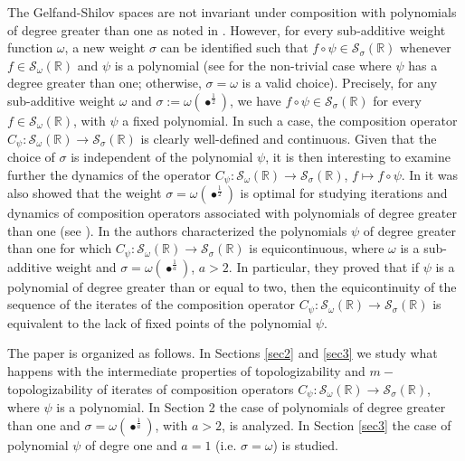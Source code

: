 \documentclass[12pt,reqno]{amsart} %
\numberwithin{equation}{section}
\begin{document}
The Gelfand-Shilov spaces are not invariant under composition with polynomials of degree greater than one as noted in \cite[Theorem 3.9]{jmaa}. However, for every sub-additive weight function $\omega$, a new weight $\sigma$
can be identified such that $f\circ \psi\in {\mathcal S}_\sigma({\mathbb R})$ 
whenever $f\in {\mathcal S}_\omega({\mathbb R})$ and $\psi$
is a polynomial (see \cite[Theorem 4.4]{jmaa} for the non-trivial case where $\psi$ has a degree greater than one; otherwise, $\sigma=\omega$ is a valid choice). Precisely, for any  sub-additive weight $\omega$  and $\sigma:=\omega(\bullet^{\frac{1}{2}})$, we have $f\circ \psi\in {\mathcal S}_\sigma({\mathbb R})$ 
for every $f\in {\mathcal S}_\omega({\mathbb R})$,  with $\psi$  a fixed
polynomial. In such a case, the composition operator $C_\psi: \mathcal{S}_{\omega}(\mathbb{R})\to \mathcal{S}_{\sigma}(\mathbb{R})$ is clearly well-defined and  continuous. Given that the choice of 
$\sigma$ is independent of the polynomial 
$\psi$, it is then interesting to examine further the dynamics of the operator $C_\psi\colon {\mathcal S}_\omega({\mathbb R})\to {\mathcal S}_\sigma({\mathbb R})$, $f\mapsto f\circ \psi$. In \cite{jmaa} it was also showed
that the weight $\sigma=\omega(\bullet^{\frac{1}{2}})$ is optimal for studying iterations and dynamics of composition
operators associated with polynomials of degree greater than one (see \cite[Corollary 3.8]{jmaa}). In \cite{RACSAM} the authors characterized the polynomials $\psi$ of degree greater than one for which $C_\psi:\mathcal{S}_{\omega}(\mathbb{R})\to \mathcal{S}_{\sigma}(\mathbb{R})$ is equicontinuous, where $\omega$ is a sub-additive weight and $\sigma=\omega(\bullet^{\frac{1}{a}})$, $a>2$. In particular, they proved that if $\psi$ is a polynomial of degree greater than or equal to two, then the equicontinuity of the sequence of the iterates of the composition operator $C_\psi:\mathcal{S}_{\omega}(\mathbb{R})\to \mathcal{S}_{\sigma}(\mathbb{R})$ is equivalent to the lack of fixed points of the polynomial $\psi$.




The paper is organized as follows.
In Sections \ref{sec2} and \ref{sec3} we  study what happens with the intermediate properties of topologizability and $m-$topologizability of iterates of composition operators $C_\psi: \mathcal{S}_{\omega}(\mathbb{R})\to \mathcal{S}_{\sigma}(\mathbb{R})$, where $\psi$ is a polynomial. In Section 2 the case of polynomials of degree greater than one and $\sigma=\omega(\bullet^{\frac{1}{a}})$, with $a>2$, is analyzed. In Section \ref{sec3}
the case of polynomial $\psi$ of degre one 
and $a=1$ (i.e. $\sigma=\omega$) is studied.
\end{document}
